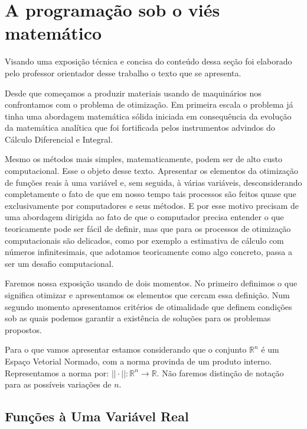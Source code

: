 \section{A programação sob o viés matemático}

Visando uma exposição técnica e concisa do conteúdo dessa seção foi elaborado pelo professor orientador desse trabalho o texto que se apresenta.

\par Desde que começamos a produzir materiais usando de maquinários nos confrontamos com o problema de otimização. Em primeira escala o problema já tinha uma abordagem matemática sólida iniciada em consequência da evolução da matemática analítica que foi fortificada pelos instrumentos advindos do Cálculo Diferencial e Integral. 

\par Mesmo os métodos mais simples, matematicamente, podem ser de alto custo computacional. Esse o objeto desse texto. Apresentar os elementos da otimização de funções reais à uma variável e, sem seguida, à várias variáveis, desconsiderando completamente o fato de que em nosso tempo tais processos são feitos quase que exclusivamente por computadores e seus métodos. E por esse motivo precisam de uma abordagem dirigida ao fato de que o computador precisa entender o que teoricamente pode ser fácil de definir, mas que para os processos de otimização computacionais são delicados, como por exemplo a estimativa de cálculo com números infinitesimais, que adotamos teoricamente como algo concreto, passa a ser um desafio computacional. 
\par Faremos nossa exposição usando de dois momentos. No primeiro definimos o que significa otimizar e apresentamos os elementos que cercam essa definição. Num segundo momento apresentamos critérios de otimalidade que definem condições sob as quais podemos garantir a existência de soluções para os problemas propostos.
\par Para o que vamos apresentar estamos considerando que o conjunto $\mathbb{R}^n$ é um Espaço Vetorial Normado, com a norma provinda de um produto interno. Representamos a norma por: $||\cdot ||: \mathbb{R}^n \rightarrow \mathbb{R}$. Não faremos distinção de notação para as possíveis variações de $n$.

\subsection{Funções à Uma Variável Real}

